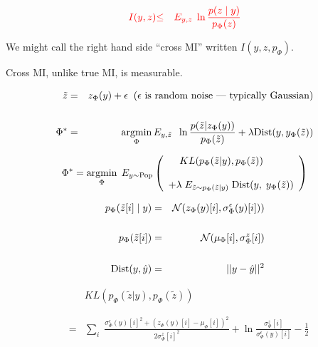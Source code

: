 {

\begin{eqnarray*}
{\color{red} I(y,z)} & {\color{red} \leq} & {\color{red} E_{y,z}\;\ln \frac{p(z\;|\;y)}{p_\Phi(z)}}
\end{eqnarray*}

\vfill
We might call the right hand side ``cross MI'' written $I(y,z,p_\Phi)$.

\vfill
Cross MI, unlike true MI, is measurable.


\begin{eqnarray*}
\tilde{z} & = & z_\Phi(y) + \epsilon \;\;\mbox{($\epsilon$ is random noise --- typically Gaussian)} \\
\\
\Phi^* & = & \operatorname*{argmin}_\Phi E_{y,\tilde{z}}\; \;\ln \frac{p(\tilde{z}|z_\Phi(y))}{p_\Phi(\tilde{z})} + \lambda \mathrm{Dist}(y,y_\Phi(\tilde{z}))
\end{eqnarray*}


$$\Phi^* = \operatorname*{argmin}_{\Phi}\;E_{y\sim \mathrm{Pop}} \left(\begin{array}{l}\;\;\;\;KL(p_\Phi(\tilde{z}|y),p_\Phi(\tilde{z})) \\
\\
+ \lambda \; E_{\tilde{z}\sim p_\Phi(\tilde{z}|y)}\;\mathrm{Dist}(y,\;y_\Phi(\tilde{z}))\end{array}\right)$$

{\color{red}
\begin{eqnarray*}
p_\Phi(\tilde{z}[i]\;|\;y) & = & {\cal N}(z_\Phi(y)[i],\sigma^\epsilon_\Phi(y)[i])) \\
\\
p_\Phi(\tilde{z}[i]) & = & {\cal N}(\mu_\Phi[i],\sigma^z_\Phi[i]) \\
\\
\mathrm{Dist}(y,\hat{y}) & = & ||y-\hat{y}||^2
\end{eqnarray*}
}


\begin{eqnarray*}
& & KL(p_\Phi(\tilde{z}|y),p_\Phi(\tilde{z})) \\
\\
\\
& = & \sum_i \;\frac{\sigma^\epsilon_\Phi(y)[i]^2 + (z_\Phi(y)[i]-\mu_\Phi[i])^2}{2 \sigma^z_\Phi[i]^2}
+ \ln\frac{\sigma^z_\Phi[i]}{\sigma^\epsilon_\Phi(y)[i]} - \frac{1}{2}
\end{eqnarray*}


}

